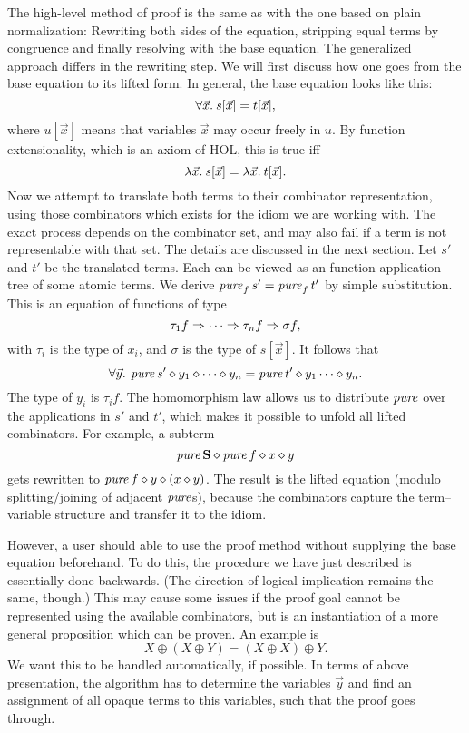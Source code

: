 The high-level method of proof is the same as with the one based on plain
normalization: Rewriting both sides of the equation, stripping equal terms by
congruence and finally resolving with the base equation.
The generalized approach differs in the rewriting step.
We will first discuss how one goes from the base equation to its lifted form.
In general, the base equation looks like this:
\[ \forall \vec x.\>s[\vec x] = t[\vec x], \]
where $u[\vec x]$ means that variables $\vec x$ may occur freely in $u$.
By function extensionality, which is an axiom of HOL, this is true iff
\[ \lambda \vec x.\>s[\vec x] = \lambda \vec x.\>t[\vec x]. \]
Now we attempt to translate both terms to their combinator representation,
using those combinators which exists for the idiom we are working with.
The exact process depends on the combinator set, and may also fail if a term
is not representable with that set.
The details are discussed in the next section.
Let $s'$ and $t'$ be the translated terms.
Each can be viewed as an function application tree of some atomic terms.
We derive $\operatorname{\mathit{pure}}_f s' = \operatorname{\mathit{pure}}_f t'$ by simple substitution.
This is an equation of functions of type
\[ \tau_1 f \Rightarrow \cdots \Rightarrow \tau_n f \Rightarrow \sigma f, \]
with $\tau_i$ is the type of $x_i$, and $\sigma$ is the type of $s[\vec x]$.
It follows that
\[ \forall \vec y.\>\operatorname{\mathit{pure}} s' \diamond y_1 \diamond \cdots \diamond y_n =
	\operatorname{\mathit{pure}} t' \diamond y_1 \cdots \diamond y_n. \]
The type of $y_i$ is $\tau_i f$.
The homomorphism law allows us to distribute $\operatorname{\mathit{pure}}$ over the applications
in $s'$ and $t'$, which makes it possible to unfold all lifted combinators.
For example, a subterm
\[ \operatorname{\mathit{pure}} \mathbf{S} \diamond \operatorname{\mathit{pure}} f \diamond x \diamond y \]
gets rewritten to $\operatorname{\mathit{pure}} f \diamond y \diamond (x \diamond y)$.
The result is the lifted equation (modulo splitting/joining of adjacent
$\operatorname{\mathit{pure}}$s), because the combinators capture the term--variable structure and
transfer it to the idiom.

However, a user should able to use the proof method without supplying the base
equation beforehand.
To do this, the procedure we have just described is essentially done backwards.
(The direction of logical implication remains the same, though.)
This may cause some issues if the proof goal cannot be represented using the
available combinators, but is an instantiation of a more general proposition
which can be proven.
An example is
\[ X \oplus (X \oplus Y) = (X \oplus X) \oplus Y. \]
We want this to be handled automatically, if possible.
In terms of above presentation, the algorithm has to determine the variables
$\vec y$ and find an assignment of all opaque terms to this variables, such
that the proof goes through.

